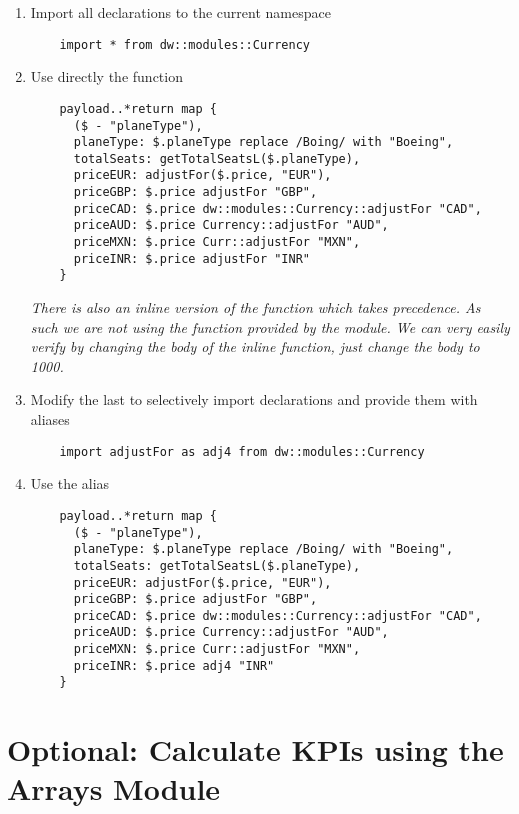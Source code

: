\begin{enumerate}[resume*]
\begin{verbatim}
    }
  \end{verbatim}
\item Import all declarations to the current namespace
  \begin{verbatim}
    import * from dw::modules::Currency
  \end{verbatim}
\item Use directly the  function
  \begin{verbatim}
    payload..*return map {
      ($ - "planeType"),
      planeType: $.planeType replace /Boing/ with "Boeing",
      totalSeats: getTotalSeatsL($.planeType),
      priceEUR: adjustFor($.price, "EUR"),
      priceGBP: $.price adjustFor "GBP",
      priceCAD: $.price dw::modules::Currency::adjustFor "CAD",
      priceAUD: $.price Currency::adjustFor "AUD",
      priceMXN: $.price Curr::adjustFor "MXN",
      priceINR: $.price adjustFor "INR"
    }
  \end{verbatim}
  \emph{
    There is also an inline version of the  function which takes precedence.
    As such we are not using the function provided by the module.  We can very easily
    verify by changing the body of the inline function, just change the body to 1000.
  }
\item Modify the last  to selectively import declarations and provide them with aliases
  \begin{verbatim}
    import adjustFor as adj4 from dw::modules::Currency
  \end{verbatim}
\item Use the  alias
  \begin{verbatim}
    payload..*return map {
      ($ - "planeType"),
      planeType: $.planeType replace /Boing/ with "Boeing",
      totalSeats: getTotalSeatsL($.planeType),
      priceEUR: adjustFor($.price, "EUR"),
      priceGBP: $.price adjustFor "GBP",
      priceCAD: $.price dw::modules::Currency::adjustFor "CAD",
      priceAUD: $.price Currency::adjustFor "AUD",
      priceMXN: $.price Curr::adjustFor "MXN",
      priceINR: $.price adj4 "INR"
    }
  \end{verbatim}
\end{enumerate}  


\section{Optional: Calculate KPIs using the Arrays Module}


